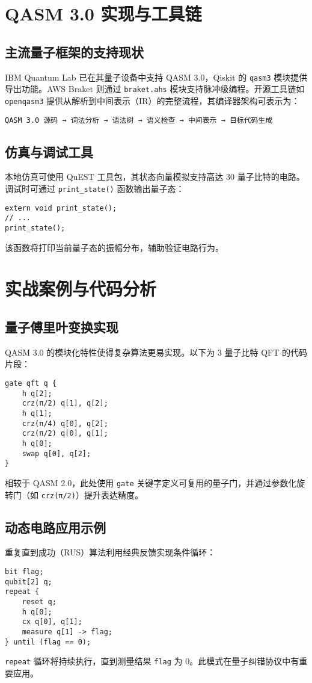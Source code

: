 \chapter{QASM 3.0 实现与工具链}
\section{主流量子框架的支持现状}
IBM Quantum Lab 已在其量子设备中支持 QASM 3.0，Qiskit 的 \verb!qasm3! 模块提供导出功能。AWS Braket 则通过 \verb!braket.ahs! 模块支持脉冲级编程。开源工具链如 \verb!openqasm3! 提供从解析到中间表示（IR）的完整流程，其编译器架构可表示为：\par
\begin{lstlisting}
QASM 3.0 源码 → 词法分析 → 语法树 → 语义检查 → 中间表示 → 目标代码生成
\end{lstlisting}
\section{仿真与调试工具}
本地仿真可使用 QuEST 工具包，其状态向量模拟支持高达 30 量子比特的电路。调试时可通过 \verb!print_state()! 函数输出量子态：\par
\begin{lstlisting}[language=qasm]
extern void print_state();
// ...
print_state();
\end{lstlisting}
该函数将打印当前量子态的振幅分布，辅助验证电路行为。\par
\chapter{实战案例与代码分析}
\section{量子傅里叶变换实现}
QASM 3.0 的模块化特性使得复杂算法更易实现。以下为 3 量子比特 QFT 的代码片段：\par
\begin{lstlisting}[language=qasm]
gate qft q {
    h q[2];
    crz(π/2) q[1], q[2];
    h q[1];
    crz(π/4) q[0], q[2];
    crz(π/2) q[0], q[1];
    h q[0];
    swap q[0], q[2];
}
\end{lstlisting}
相较于 QASM 2.0，此处使用 \verb!gate! 关键字定义可复用的量子门，并通过参数化旋转门（如 \verb!crz(π/2)!）提升表达精度。\par
\section{动态电路应用示例}
重复直到成功（RUS）算法利用经典反馈实现条件循环：\par
\begin{lstlisting}[language=qasm]
bit flag;
qubit[2] q;
repeat {
    reset q;
    h q[0];
    cx q[0], q[1];
    measure q[1] -> flag;
} until (flag == 0);
\end{lstlisting}
\verb!repeat! 循环将持续执行，直到测量结果 \verb!flag! 为 0。此模式在量子纠错协议中有重要应用。\par
